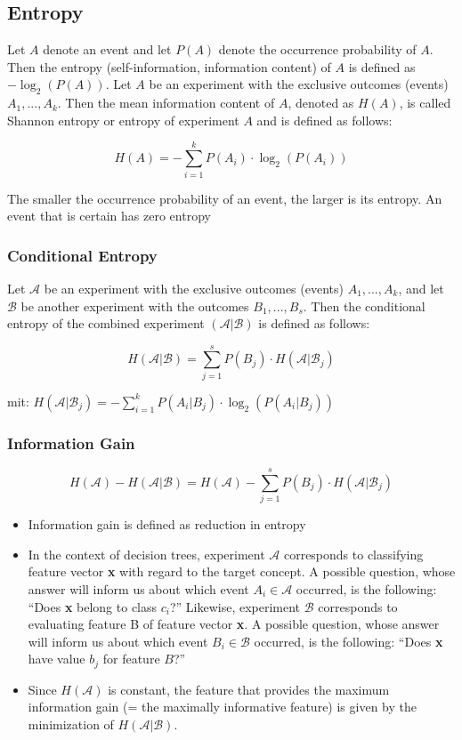 \documentclass[11pt,a4paper]{article}
\begin{document}
\begin{flushleft}
\subsection{Entropy}

Let $A$ denote an event and let $P(A)$ denote the occurrence probability of $A$. Then the entropy (self-information, information content) of $A$ is defined as $ - \log _2 (P(A)) $. Let $A$ be an experiment with the exclusive outcomes (events) $A_1, . . . , A_k$. Then the mean information content of $A$, denoted as $H(A)$, is called Shannon entropy or entropy of experiment $A$ and is defined as follows:

$$ H(A) = - \sum_{i=1}^{k} P(A_i) \cdot \log _2 (P(A_i)) $$

The smaller the occurrence probability of an event, the larger is its entropy. An event that is
certain has zero entropy

\subsubsection{Conditional Entropy}

Let $\mathcal{A}$ be an experiment with the exclusive outcomes (events) $A_1, ... , A_k$, and let $\mathcal{B}$ be another experiment with the outcomes $B_1, ... , B_s$. Then the conditional entropy
of the combined experiment $ (\mathcal{A} | \mathcal{B} )$ is defined as follows:

$$ H(\mathcal{A} | \mathcal{B} ) = \sum_{j = 1}^s P(B_j)\cdot H(\mathcal{A} | \mathcal{B} _j ) $$

mit: $ H(\mathcal{A} | \mathcal{B} _j ) = - \sum_{i = 1}^k P(A_i | B_j )\cdot \log _2 (P (A_i | B_j ))$

\subsubsection{Information Gain} 

$$  H(\mathcal{A}) - H(\mathcal{A} | \mathcal{B} ) = H(\mathcal{A}) - \sum_{j = 1}^s P(B_j)\cdot H(\mathcal{A} | \mathcal{B} _j ) $$

\begin{itemize}
\item Information gain is defined as reduction in entropy
\item In the context of decision trees, experiment $\mathcal{A}$ corresponds to classifying feature vector \textbf{x} with regard to the target concept. A possible question, whose answer will inform us about which
event $A_i \in \mathcal{A}$ occurred, is the following: “Does \textbf{x} belong to class $c_i$?”
Likewise, experiment $\mathcal{B}$ corresponds to evaluating feature B of feature vector \textbf{x}. A possible question, whose answer will inform us about which event $B_i \in \mathcal{B} $ occurred, is the following: “Does \textbf{x} have value $b_j$ for feature $B$?”
\item Since $H(\mathcal{A})$ is constant, the feature that provides the maximum information gain (= the
maximally informative feature) is given by the minimization of $H(\mathcal{A} | \mathcal{B} )$.
\end{itemize}


\end{flushleft}
\end{document}
